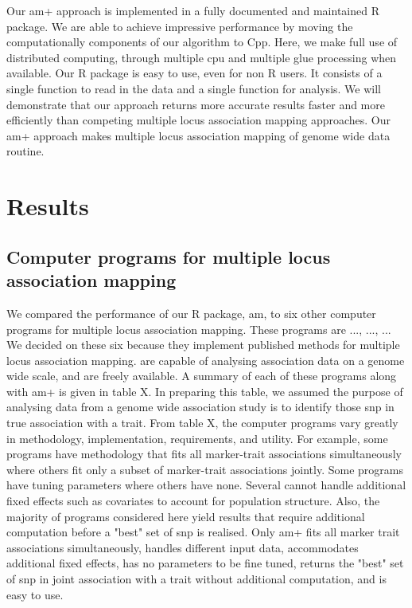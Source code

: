 \documentclass[12pt]{article}
\begin{document}
Our am+ approach is implemented in a fully documented and maintained R package. 
We are able to achieve impressive performance by moving the computationally 
components of our algorithm to Cpp. Here, we make full use of distributed 
computing, through multiple cpu and multiple glue processing when available. 
Our R package is easy to use, even for non  R users. It consists of a single function
 to read in the data and a single function for analysis. We will demonstrate that 
 our approach returns more accurate results faster and more efficiently than 
 competing multiple locus association mapping approaches. Our am+ approach 
 makes multiple locus association mapping of genome wide data routine.

\section{Results}


\subsection{Computer programs for   multiple locus association mapping}

We compared the performance of our R package, am, to six other computer programs for multiple locus association mapping. These programs are ..., ..., ... We decided on these six because they implement published methods for multiple locus association mapping.  are capable of analysing association data on a genome wide scale, and are freely available. A summary of each of these programs along with am+ is given in table X. In preparing this table, we assumed the purpose of analysing data from a genome wide association study is to identify those snp in true association with a trait.  From table X, the computer programs vary greatly in methodology, implementation, requirements, and utility.  For example, some programs have methodology that fits all marker-trait associations simultaneously where others  fit only a subset of marker-trait associations jointly. Some programs have tuning parameters where others have none. Several cannot handle additional fixed effects such as covariates to account for population structure. Also, the majority of programs considered here yield results that require additional computation before a "best" set of snp is realised. Only am+  fits all marker trait associations simultaneously, handles different input data, accommodates additional fixed effects, has no parameters to be fine tuned, returns the "best" set of snp in joint association with a trait without additional computation, and is easy to use. 
\end{document}
